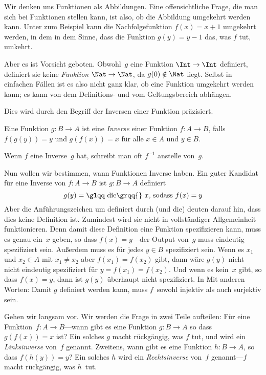 \documentclass[../../../include/open-logic-section]{subfiles}
\begin{document}

\begin{explain}
Wir denken uns Funktionen als Abbildungen. Eine offensichtliche Frage, die man sich bei
Funktionen stellen kann, ist also, ob die Abbildung \glqq umgekehrt\grqq{} werden kann. Unter
zum Beispiel kann die Nachfolgefunktion $f(x) = x + 1$ umgekehrt werden, in dem
in dem Sinne, dass die Funktion $g(y) = y - 1$ das, was $f$ tut, \glqq umkehrt\grqq{}. 

Aber es ist Vorsicht geboten. Obwohl~$g$ eine
Funktion $\Int \to \Int$ definiert, definiert sie keine \emph{Funktion} $\Nat
\to \Nat$, da $g(0) \notin \Nat$ liegt.  Selbst in einfachen Fällen ist es also
nicht ganz klar, ob eine Funktion umgekehrt werden kann; es kann von dem Definitions-
und vom Geltungsbereich abhängen.

Dies wird durch den Begriff der Inversen einer Funktion präzisiert.
\end{explain}

\begin{defn}
Eine Funktion $g \colon B \to A$ ist eine \emph{Inverse} einer Funktion $f
\colon A \to B$, falls $f(g(y)) = y$ und $g(f(x)) = x$ für alle $x \in A$
und $y \in B$.
\end{defn}

Wenn $f$ eine Inverse~$g$ hat, schreibt man oft $f^{-1}$ anstelle von~$g$.

\begin{explain}
Nun wollen wir bestimmen, wann Funktionen Inverse haben. Ein guter Kandidat
für eine Inverse von $f\colon A \to B$ ist $g\colon B \to A$ \glqq definiert\grqq{}
\[
g(y) = \text{\glqq die\grqq{} $x$, sodass $f(x) = y$}
\]
Aber die Anführungszeichen um \glqq definiert\grqq{} durch (und \glqq die\grqq{}) deuten darauf hin, dass
dies keine Definition ist.  Zumindest wird sie nicht in vollständiger Allgemeinheit funktionieren.
Denn damit diese Definition eine Funktion spezifizieren kann, muss es genau ein~$x$ geben,
so dass $f(x) =
y$---der Output von~$g$ muss eindeutig spezifiziert sein. Außerdem muss es
für jedes $y \in B$ spezifiziert sein.  Wenn es $x_1$ und $x_2 \in
A$ mit $x_1 \neq x_2$ aber $f(x_1) = f(x_2)$ gibt, dann wäre $g(y)$ nicht
nicht eindeutig spezifiziert für $y = f(x_1) = f(x_2)$. Und wenn es kein~$x$
gibt, so dass $f(x) = y$, dann ist $g(y)$ überhaupt nicht spezifiziert.  In
Mit anderen Worten: Damit $g$ definiert werden kann, muss $f$~sowohl injektiv als auch
surjektiv sein.

Gehen wir langsam vor. Wir werden die Frage in zwei Teile aufteilen: Für eine
Funktion~$f\colon A \to B$---wann gibt es eine Funktion $g\colon B \to A$
so dass $g(f(x)) = x$ ist? Ein solches $g$ \glqq macht rückgängig\grqq{}, was $f$ tut, und wird
ein \emph{Linksinverse} von~$f$ genannt. Zweitens, wann gibt es eine
Funktion $h \colon B \to A$, so dass $f(h(y)) = y$? Ein solches $h$ wird
ein \emph{Rechtsinverse} von~$f$ genannt---$f$ \glqq macht rückgängig\grqq{}, was $h$~tut.
\end{explain}
\end{document}
